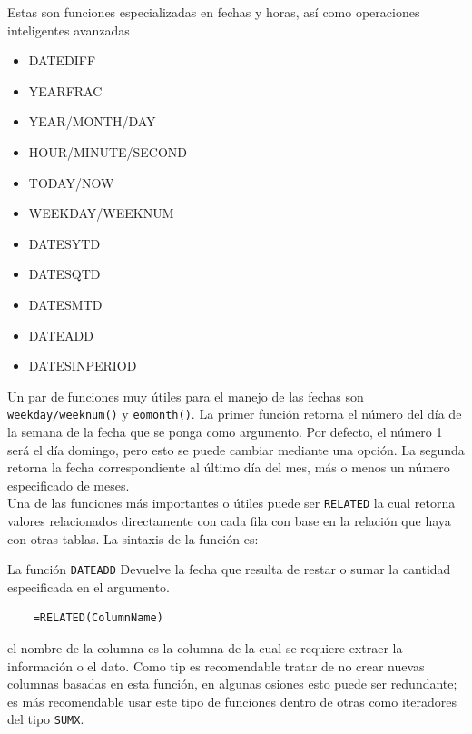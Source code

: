 \begin{enumerate}
            Estas son funciones especializadas en fechas y horas, así como operaciones inteligentes avanzadas
            \begin{itemize}
                \item DATEDIFF
                \item YEARFRAC
                \item YEAR/MONTH/DAY
                \item HOUR/MINUTE/SECOND
                \item TODAY/NOW
                \item WEEKDAY/WEEKNUM
                \item DATESYTD
                \item DATESQTD
                \item DATESMTD
                \item DATEADD
                \item DATESINPERIOD
            \end{itemize}
\end{enumerate}


Un par de funciones muy útiles para el manejo de las fechas son \texttt{weekday/weeknum()} y \texttt{eomonth()}. La primer función retorna el número del día de la semana de la fecha que se ponga como argumento. Por defecto, el número 1 será el día domingo, pero esto se puede cambiar mediante una opción. La segunda retorna la fecha correspondiente al último día del mes, más o menos un número especificado de meses.\\

Una de las funciones más importantes o útiles puede ser \texttt{RELATED} la cual retorna valores relacionados directamente con cada fila con base en la relación que haya con otras tablas. La sintaxis de la función es:

La función \texttt{DATEADD} Devuelve la fecha que resulta de restar o sumar la cantidad especificada en el argumento.


\begin{verbatim}
    =RELATED(ColumnName)
\end{verbatim}

el nombre de la columna es la columna de la cual se requiere extraer la información o el dato. Como tip es recomendable tratar de no crear nuevas columnas basadas en esta función, en algunas osiones esto puede ser redundante; es más recomendable usar este tipo de funciones dentro de otras como iteradores del tipo \texttt{SUMX}.



